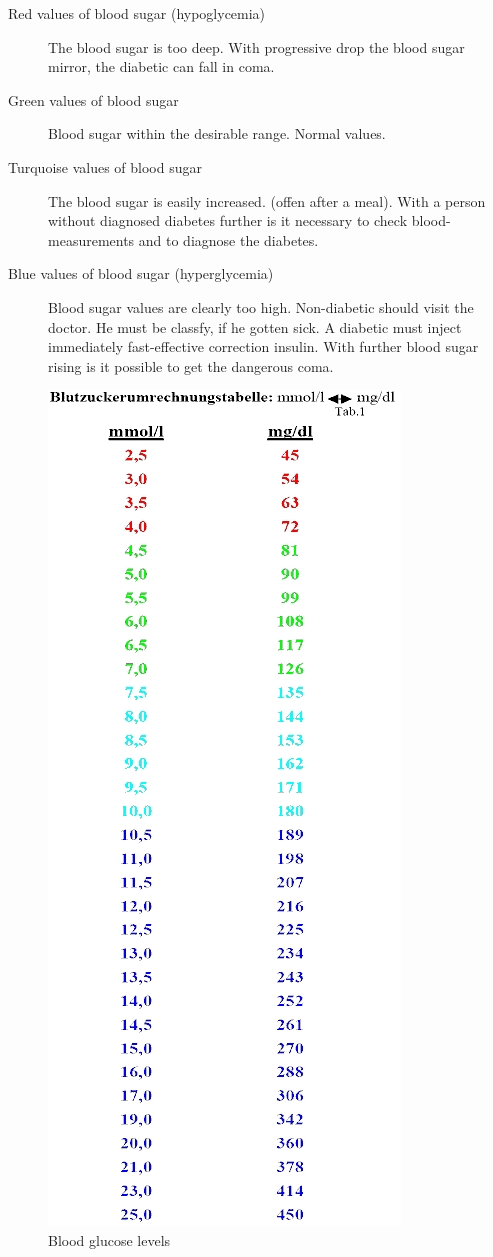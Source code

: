 \begin{description}
  \item[Red values of blood sugar (hypoglycemia)] The blood sugar is too deep. With progressive drop the blood sugar mirror, the diabetic can fall in coma.
  \item[Green values of blood sugar] Blood sugar within the desirable range. Normal values.
  \item[Turquoise values of blood sugar] The blood sugar is easily increased. (offen after a meal). With a person without diagnosed diabetes further is it necessary to check blood-measurements and to diagnose the diabetes.
  \item[Blue values of blood sugar (hyperglycemia)] Blood sugar values are clearly too high. Non-diabetic should visit the doctor. 
He must be classfy, if he gotten sick. A diabetic must inject immediately fast-effective correction insulin. 
With further blood sugar rising is it possible to get the dangerous coma.
\end{description}
\begin{figure}[htb]
\centering
\includegraphics[scale=0.6]{images/Conversion.jpg}
\caption{Blood glucose levels}
\end{figure}
